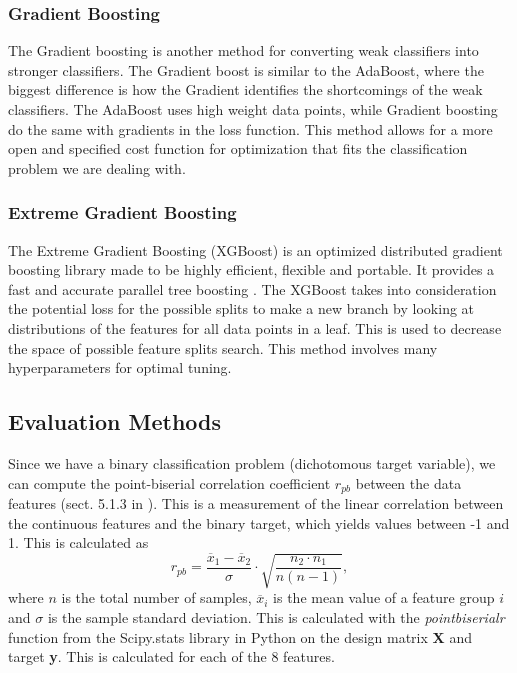 \documentclass[12pt,a4paper,english]{article}
\begin{document}
\subsubsection{Gradient Boosting}
\label{subsubsect:Grad}
The Gradient boosting is another method for converting weak classifiers into stronger classifiers. The Gradient boost is similar to the AdaBoost, where the biggest difference is how the Gradient identifies the shortcomings of the weak classifiers. The AdaBoost uses high weight data points, while Gradient boosting do the same with gradients in the loss function. This method allows for a more open and specified cost function for optimization that fits the classification problem we are dealing with. \cite{hastie2009} 

\subsubsection{Extreme Gradient Boosting}
\label{subsubsect:XGB}
The Extreme Gradient Boosting (XGBoost) is an optimized distributed gradient boosting library made to be highly efficient, flexible and portable. It provides a fast and accurate parallel tree boosting \cite{lect_trees}. The XGBoost takes into consideration the potential loss for the possible splits to make a new branch by looking at distributions of the features for all data points in a leaf. This is used to decrease the space of possible feature splits search. This method involves many hyperparameters for optimal tuning. 

\subsection{Evaluation Methods}
\label{subsect:eval_methods}
Since we have a binary classification problem (dichotomous target variable), we can compute the point-biserial correlation coefficient $r_{pb}$ between the data features (sect. 5.1.3 in \citet{pulsar_art}). This is a measurement of the linear correlation between the continuous features and the binary target, which yields values between -1 and 1. This is calculated as 
\begin{equation}
\label{eq:point_biserial}
r_{pb}=\frac{\overline{x}_1-\overline{x}_2}{\sigma}\cdot\sqrt{\frac{n_2\cdot n_1}{n(n-1)}},
\end{equation}
where $n$ is the total number of samples, $\overline{x}_i$ is the mean value of a feature group $i$ and $\sigma$ is the sample standard deviation. This is calculated with the \textit{pointbiserialr} function from the Scipy.stats library in Python on the design matrix \textbf{X} and target \textbf{y}. This is calculated for each of the 8 features.
\end{document}

